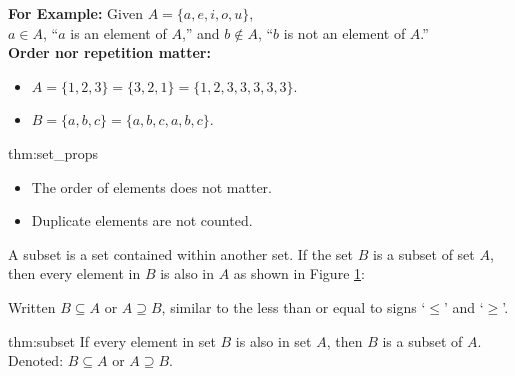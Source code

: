 \noindent
\textbf{For Example:} Given $A = \{a, e, i, o, u\}$,\\
$a \in A$, ``$a$ is an element of $A$,'' and
$b \notin A$, ``$b$ is not an element of $A$.''\\

\noindent
\textbf{Order nor repetition matter:}
\begin{itemize}
    \item $A = \{1, 2, 3\} = \{3, 2, 1\} = \{1, 2, 3, 3, 3, 3, 3\}$.
    \item $B = \{a, b, c\} = \{a, b, c, a, b, c\}$.
\end{itemize}

\begin{theo}{thm:set_props}
    \begin{itemize}
        \item The order of elements does not matter.
        \item Duplicate elements are not counted.
    \end{itemize}
\end{theo}

\noindent
A subset is a set contained within another set. If the set $B$ is a subset of set $A$,
then every element in $B$ is also in $A$ as shown in Figure \ref{fig:subset}:

\vspace{2em}
\begin{figure}[ht]
    \centering
    \caption{}
    \label{fig:subset}
\end{figure}

\newpage
\noindent
Written $B \subseteq A$ or $A \supseteq B$, similar to the less than or
equal to signs `$\leq$' and `$\geq$'.

\begin{theo}[Subset]{thm:subset}
    If every element in set $B$ is also in set $A$, then $B$ is a subset of $A$.\\
    Denoted: $B \subseteq A$ or $A \supseteq B$.
\end{theo}

